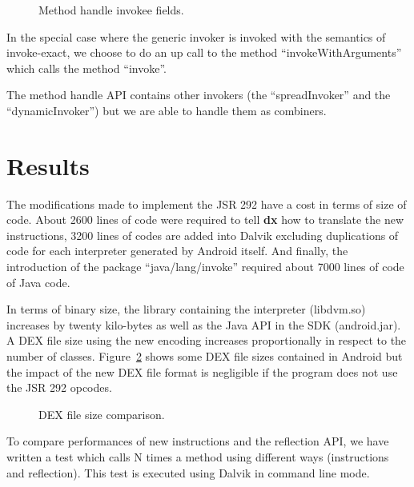 \documentclass{sig-alternate}
\def \DALVIK{Dalvik\xspace}
\def \Jsr{JSR\xspace}
\def \JSR{\Jsr 292\xspace}
\def \ANDROID{Android\xspace}
\newcommand{\fixme}[1]{{\color{red}FIXME #1}}
\begin{document}
      \begin{figure}[!ht]
        \centering \vspace{-1.5em}
        \caption{Method handle invokee fields.}
        \label{invokeeFields}
      \end{figure}

      In the special case where the generic invoker is invoked with the semantics of invoke-exact,
      we choose to do an up call to the method ``invokeWithArguments'' which calls the method ``invoke''.

      The method handle API contains other invokers (the ``spreadInvoker'' and the ``dynamicInvoker'')
      but we are able to handle them as combiners.

\section{Results}
 \label{result}

  The modifications made to implement the \JSR have a cost in terms of size of code.
  About 2600 lines of code were required to tell {\bf dx} how to translate the new instructions,
  3200 lines of codes are added into Dalvik excluding duplications of code for each interpreter generated by \ANDROID itself.
  And finally, the introduction of the package ``java/lang/invoke'' required about 7000 lines of code of Java code.


  In terms of binary size, the library containing the interpreter (libdvm.so) increases by twenty kilo-bytes
  as well as the Java API in the SDK (android.jar).
  A DEX file size using the new encoding increases proportionally in respect to the number of classes.
  Figure~\ref{Rsize} shows some DEX file sizes contained in \ANDROID but
  the impact of the new DEX file format is negligible if the program does not use the \JSR opcodes.

  \begin{figure}[!ht]
    \dataset
    \resizebox{.9\linewidth}{!}{}
    \caption{DEX file size comparison.}
    \label{Rsize}
  \end{figure}

  To compare performances of new instructions and the reflection API,
  we have written a test which calls N times a method using different ways (instructions and reflection).
  This test is executed using \DALVIK in command line mode.
\end{document}
